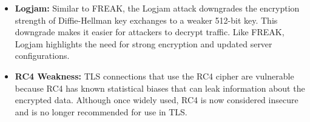 \begin{itemize}
    \item \textbf{Logjam:} Similar to FREAK, the Logjam attack downgrades the encryption strength of Diffie-Hellman key exchanges to a weaker 512-bit key. This downgrade makes it easier for attackers to decrypt traffic. Like FREAK, Logjam highlights the need for strong encryption and updated server configurations.

    \item \textbf{RC4 Weakness:} TLS connections that use the RC4 cipher are vulnerable because RC4 has known statistical biases that can leak information about the encrypted data. Although once widely used, RC4 is now considered insecure and is no longer recommended for use in TLS.
\end{itemize}

